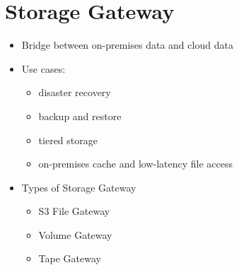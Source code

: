 \section{Storage Gateway}
\begin{itemize}
    \item Bridge between on-premises data and cloud data
    \item Use cases:
    \begin{itemize}
        \item disaster recovery
        \item backup and restore
        \item tiered storage
        \item on-premises cache and low-latency file access
    \end{itemize}
    \item Types of Storage Gateway
    \begin{itemize}
        \item S3 File Gateway
        \item Volume Gateway
        \item Tape Gateway
    \end{itemize}
\end{itemize}

